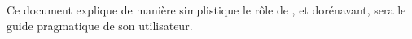 \begin{center}
\parbox{33em}{
\textcolor{purplish}{
Ce document explique de manière simplistique le r\^ole
de \yerothpgiblack, et dorénavant, sera le guide
pragmatique de son utilisateur.}
}
\end{center}
